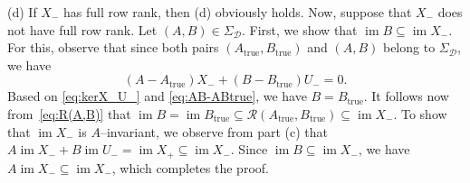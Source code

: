 \documentclass[9pt,shortpaper,twoside,web]{ieeecolor}
\DeclareMathOperator{\im}{im}
\begin{document}
(d) If $X_-$ has full row rank, then (d) obviously holds. Now, suppose that $X_-$ does not have full row rank. Let $(A,B)\in\Sigma_\mathcal{D}$. First, we show that $\im B\subseteq\im X_-$. For this, observe that since both pairs $(A_\text{true},B_\text{true})$ and $(A,B)$ belong to $\Sigma_\mathcal{D}$, we have
\begin{equation}
\label{eq:AB-ABtrue}
(A-A_\text{true})X_- + (B-B_\text{true})U_-=0.
\end{equation}
Based on \eqref{eq:kerX_U_} and \eqref{eq:AB-ABtrue}, we have $B=B_\text{true}$. It follows now from~\eqref{eq:R(A,B)} that $\im B=\im B_\text{true}\subseteq\mathcal{R}(A_\text{true},B_\text{true})\subseteq\im X_-$. To show that $\im X_-$ is $A$--invariant, we observe from part (c) that \mbox{$A\im X_-+B\im U_-=\im X_+\subseteq\im X_-$}.
Since $\im B\subseteq \im X_-$, we have $A\im X_-\subseteq\im X_-$, which completes the proof.  \hfill \QED
\end{document}
